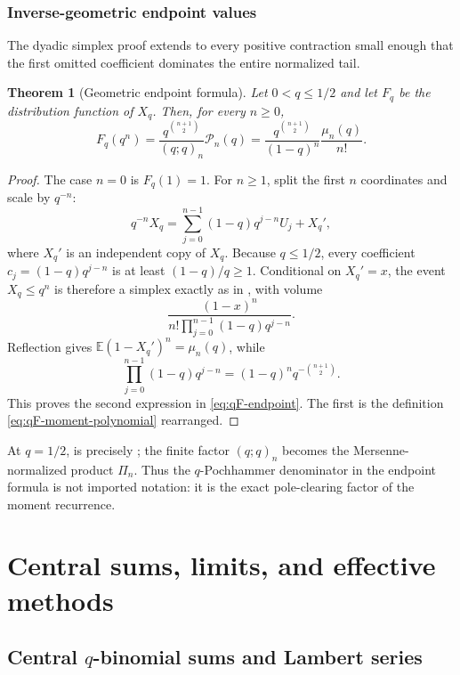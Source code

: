 \documentclass[11pt,oneside,openany]{book}
\newtheorem{theorem}{Theorem}[chapter]
\theoremstyle{definition}
\theoremstyle{remark}
\newcommand{\Expect}{\mathbb E}
\begin{document}
\section{Inverse-geometric endpoint values}

The dyadic simplex proof extends to every positive contraction small enough
that the first omitted coefficient dominates the entire normalized tail.

\begin{theorem}[Geometric endpoint formula]\label{thm:qF-endpoint}
Let $0<q\le1/2$ and let $F_q$ be the distribution function of $X_q$.  Then,
for every $n\ge0$,
\begin{equation}\label{eq:qF-endpoint}
 \boxed{
 F_q(q^n)=
 \frac{q^{\binom{n+1}{2}}}{(q;q)_n}\mathcal P_n(q)
 =\frac{q^{\binom{n+1}{2}}}{(1-q)^n}
   \frac{\mu_n(q)}{n!}.}
\end{equation}
\end{theorem}

\begin{proof}
The case $n=0$ is $F_q(1)=1$.  For $n\ge1$, split the first $n$ coordinates
and scale by $q^{-n}$:
\[
 q^{-n}X_q=
 \sum_{j=0}^{n-1}(1-q)q^{j-n}U_j+X_q',
\]
where $X_q'$ is an independent copy of $X_q$.  Because $q\le1/2$, every
coefficient
$c_j=(1-q)q^{j-n}$ is at least $(1-q)/q\ge1$.  Conditional on
$X_q'=x$, the event $X_q\le q^n$ is therefore a simplex exactly as in
, with volume
\[
 \frac{(1-x)^n}{n!\prod_{j=0}^{n-1}(1-q)q^{j-n}}.
\]
Reflection gives $\Expect(1-X_q')^n=\mu_n(q)$, while
\[
 \prod_{j=0}^{n-1}(1-q)q^{j-n}
 =(1-q)^nq^{-\binom{n+1}{2}}.
\]
This proves the second expression in \eqref{eq:qF-endpoint}.  The first is the
definition \eqref{eq:qF-moment-polynomial} rearranged.
\end{proof}

At $q=1/2$,  is precisely
; the finite factor
$(q;q)_n$ becomes the Mersenne-normalized product $\Pi_n$.  Thus the
$q$-Pochhammer denominator in the endpoint formula is not imported notation:
it is the exact pole-clearing factor of the moment recurrence.


\part{Central sums, limits, and effective methods}

\chapter{Central \texorpdfstring{$q$}{q}-binomial sums and Lambert series}\label{chap:central}
\end{document}
